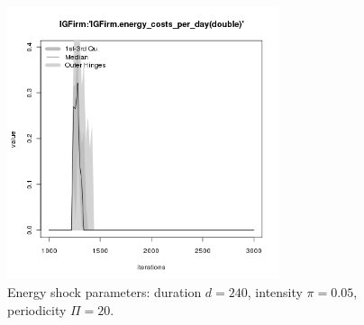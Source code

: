 \begin{figure}[ht!]
\begin{minipage}{17cm}
\includegraphics[width=8cm]{./energy_shock/png/duration_240/intensity_0.05/frequency_20/IGFirm-energy_costs_per_day.png}
\end{minipage}
\caption{Energy shock parameters: duration $d=240$, intensity $\pi=0.05$, periodicity $\Pi=20$.}
\label{Figure: energy shock 4}
\end{figure}


%

